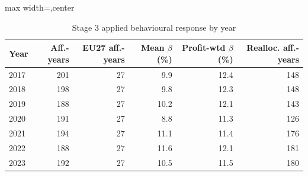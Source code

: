 \begin{table}[H]
\centering
\footnotesize
\setlength{\tabcolsep}{2pt}
\caption{Stage 3 applied behavioural response by year}
\label{tab:app_stage3_behaviour_by_year}
\begin{adjustbox}{max width=\textwidth,center}
\begin{tabular}{@{}lrrrrr@{}}
\toprule
Year & Aff.-years & EU27 aff.-years & Mean $\beta$ (\%) & Profit-wtd $\beta$ (\%) & Realloc. aff.-years \\
\midrule
2017 & 201 & 27 &  9.9 & 12.4 & 148 \\
2018 & 198 & 27 &  9.8 & 12.3 & 148 \\
2019 & 188 & 27 & 10.2 & 12.1 & 143 \\
2020 & 191 & 27 &  8.8 & 11.3 & 126 \\
2021 & 194 & 27 & 11.1 & 11.4 & 176 \\
2022 & 188 & 27 & 11.6 & 12.1 & 181 \\
2023 & 192 & 27 & 10.5 & 11.5 & 180 \\
\bottomrule
\end{tabular}
\end{adjustbox}
\end{table}
